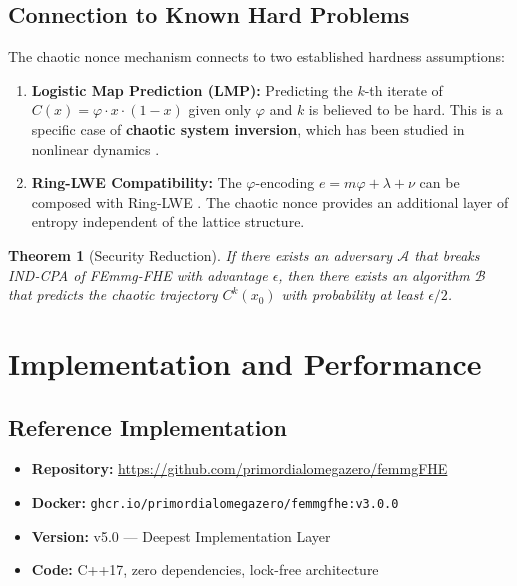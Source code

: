 \documentclass{article}
\newtheorem{theorem}{Theorem}[section]
\begin{document}
\subsection{Connection to Known Hard Problems}

The chaotic nonce mechanism connects to two established hardness assumptions:

\begin{enumerate}
    \item \textbf{Logistic Map Prediction (LMP):} Predicting the $k$-th iterate of $C(x) = \varphi \cdot x \cdot (1-x)$ given only $\varphi$ and $k$ is believed to be hard. This is a specific case of \textbf{chaotic system inversion}, which has been studied in nonlinear dynamics \cite{strogatz2018}.
    
    \item \textbf{Ring-LWE Compatibility:} The $\varphi$-encoding $e = m\varphi + \lambda + \nu$ can be composed with Ring-LWE \cite{lyubashevsky2010}. The chaotic nonce provides an additional layer of entropy independent of the lattice structure.
\end{enumerate}

\begin{theorem}[Security Reduction]
If there exists an adversary $\mathcal{A}$ that breaks IND-CPA of FEmmg-FHE with advantage $\epsilon$, then there exists an algorithm $\mathcal{B}$ that predicts the chaotic trajectory $C^k(x_0)$ with probability at least $\epsilon/2$.
\end{theorem}

\section{Implementation and Performance}

\subsection{Reference Implementation}

\begin{itemize}
    \item \textbf{Repository:} \url{https://github.com/primordialomegazero/femmgFHE}
    \item \textbf{Docker:} \texttt{ghcr.io/primordialomegazero/femmgfhe:v3.0.0}
    \item \textbf{Version:} v5.0 — Deepest Implementation Layer
    \item \textbf{Code:} C++17, zero dependencies, lock-free architecture
\end{itemize}
\end{document}
